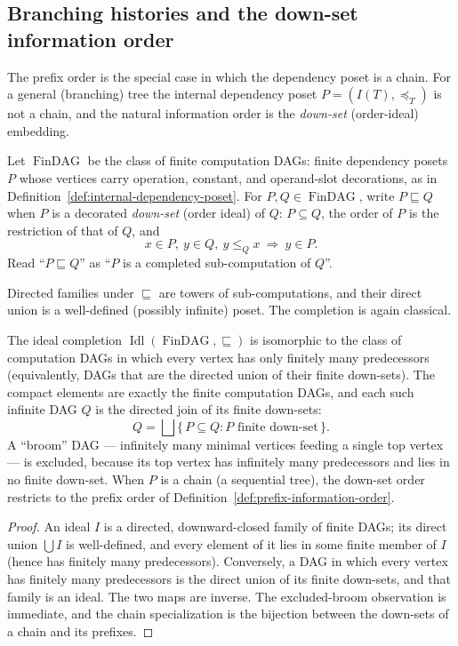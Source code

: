 \subsection{Branching histories and the down-set information order}

The prefix order is the special case in which the dependency poset is a chain.
For a general (branching) tree the internal dependency poset
$P=(I(T),\preccurlyeq_T)$ is not a chain, and the natural information order is
the \emph{down-set} (order-ideal) embedding.

\begin{definition}
\label{def:downset-information-order}
Let $\operatorname{FinDAG}$ be the class of finite computation DAGs: finite
dependency posets $P$ whose vertices carry operation, constant, and operand-slot
decorations, as in Definition~\ref{def:internal-dependency-poset}.  For
$P,Q\in\operatorname{FinDAG}$, write $P\sqsubseteq Q$ when $P$ is a decorated
\emph{down-set} (order ideal) of $Q$: $P\subseteq Q$, the order of $P$ is the
restriction of that of $Q$, and
\[
x\in P,\ y\in Q,\ y\le_Q x \ \Longrightarrow\ y\in P .
\]
Read ``$P\sqsubseteq Q$'' as ``$P$ is a completed sub-computation of $Q$''.
\end{definition}

Directed families under $\sqsubseteq$ are towers of sub-computations, and their
direct union is a well-defined (possibly infinite) poset.  The completion is
again classical.

\begin{theorem}
\label{thm:branching-dag-dcpo}
The ideal completion $\operatorname{Idl}(\operatorname{FinDAG},\sqsubseteq)$ is
isomorphic to the class of computation DAGs in which every vertex has only
finitely many predecessors (equivalently, DAGs that are the directed union of
their finite down-sets).  The compact elements are exactly the finite
computation DAGs, and each such infinite DAG $Q$ is the directed join of its
finite down-sets:
\[
Q=\bigsqcup\{\,P\subseteq Q:P \text{ finite down-set}\,\}.
\]
A ``broom'' DAG --- infinitely many minimal vertices feeding a single top
vertex --- is excluded, because its top vertex has infinitely many predecessors
and lies in no finite down-set.  When $P$ is a chain (a sequential tree), the
down-set order restricts to the prefix order of
Definition~\ref{def:prefix-information-order}.
\end{theorem}

\begin{proof}
An ideal $I$ is a directed, downward-closed family of finite DAGs; its direct
union $\bigcup I$ is well-defined, and every element of it lies in some finite
member of $I$ (hence has finitely many predecessors).  Conversely, a DAG in
which every vertex has finitely many predecessors is the direct union of its
finite down-sets, and that family is an ideal.  The two maps are inverse.  The
excluded-broom observation is immediate, and the chain specialization is the
bijection between the down-sets of a chain and its prefixes.
\end{proof}

